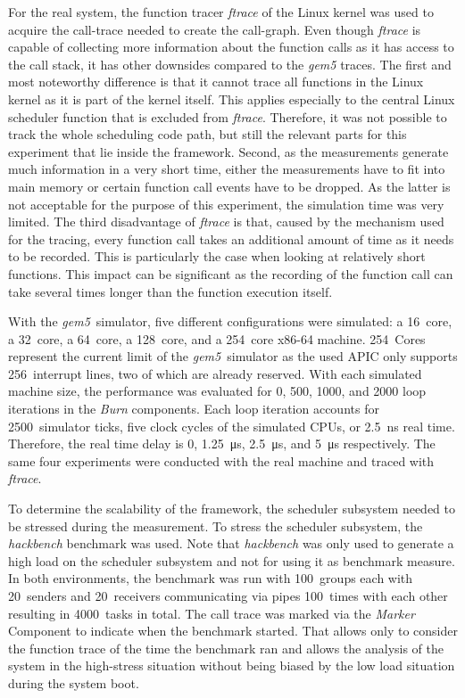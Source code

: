 For the real system, the function tracer \emph{ftrace} of the Linux kernel was used to acquire the call-trace needed to create the call-graph. Even though \emph{ftrace} is capable of collecting more information about the function calls as it has access to the call stack, it has other downsides compared to the \emph{gem5} traces. The first and most noteworthy difference is that it cannot trace all functions in the Linux kernel as it is part of the kernel itself. This applies especially to the central Linux scheduler function that is excluded from \emph{ftrace}. Therefore, it was not possible to track the whole scheduling code path, but still the relevant parts for this experiment that lie inside the framework. Second, as the measurements generate much information in a very short time, either the measurements have to fit into main memory or certain function call events have to be dropped. As the latter is not acceptable for the purpose of this experiment, the simulation time was very limited. The third disadvantage of \emph{ftrace} is that, caused by the mechanism used for the tracing, every function call takes an additional amount of time as it needs to be recorded. This is particularly the case when looking at relatively short functions. This impact can be significant as the recording of the function call can take several times longer than the function execution itself.

With the \emph{gem5}~simulator, five different configurations were simulated: a 16~core, a 32~core, a 64~core, a 128~core, and a 254~core x86-64 machine. 254~Cores represent the current limit of the \emph{gem5}~simulator as the used \ac{APIC} only supports 256~interrupt lines, two of which are already reserved. With each simulated machine size, the performance was evaluated for 0, 500, 1000, and 2000 loop iterations in the \emph{Burn} components. Each loop iteration accounts for 2500~simulator ticks, five clock cycles of the simulated CPUs, or \SI{2.5}{\nano\second} real time. Therefore, the real time delay is 0, \SI{1.25}{\micro\second}, \SI{2.5}{\micro\second}, and \SI{5}{\micro\second} respectively. The same four experiments were conducted with the real machine and traced with \emph{ftrace}.

To determine the scalability of the \cobas{} framework, the scheduler subsystem needed to be stressed during the measurement. To stress the scheduler subsystem, the \emph{hackbench} benchmark was used. Note that \emph{hackbench} was only used to generate a high load on the scheduler subsystem and not for using it as benchmark measure. In both environments, the benchmark was run with \num{100}~groups each with \num{20}~senders and \num{20}~receivers communicating via pipes \num{100}~times with each other resulting in \num{4000}~tasks in total. The call trace was marked via the \emph{Marker} Component to indicate when the benchmark started. That allows only to consider the function trace of the time the benchmark ran and allows the analysis of the system in the high-stress situation without being biased by the low load situation during the system boot.

